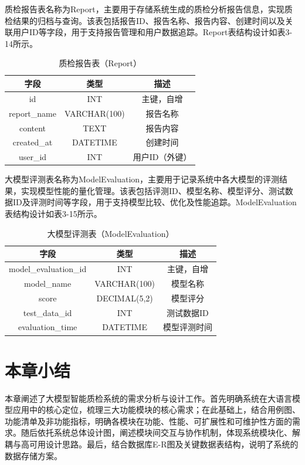 质检报告表名称为Report，主要用于存储系统生成的质检分析报告信息，实现质检结果的归档与查询。该表包括报告ID、报告名称、报告内容、创建时间以及关联用户ID等字段，用于支持报告管理和用户数据追踪。Report表结构设计如表3-14所示。
\begin{table}[h!]
\centering
\caption{质检报告表（Report）}
\begin{tabular}{|c|c|c|}
\hline
字段              & 类型         & 描述                    \\
\hline
id                & INT          & 主键，自增              \\
report\_name      & VARCHAR(100) & 报告名称                \\
content           & TEXT         & 报告内容                \\
created\_at       & DATETIME     & 创建时间                \\
user\_id          & INT          & 用户ID（外键）          \\
\hline
\end{tabular}
\end{table}

大模型评测表名称为ModelEvaluation，主要用于记录系统中各大模型的评测结果，实现模型性能的量化管理。该表包括评测ID、模型名称、模型评分、测试数据ID及评测时间等字段，用于支持模型比较、优化及性能追踪。ModelEvaluation表结构设计如表3-15所示。
\begin{table}[h!]
\centering
\caption{大模型评测表（ModelEvaluation）}
\begin{tabular}{|c|c|c|}
\hline
字段              & 类型         & 描述                    \\
\hline
model\_evaluation\_id                & INT          & 主键，自增              \\
model\_name       & VARCHAR(100) & 模型名称                \\
score             & DECIMAL(5,2) & 模型评分                \\
test\_data\_id    & INT          & 测试数据ID              \\
evaluation\_time  & DATETIME     & 模型评测时间            \\
\hline
\end{tabular}
\end{table}

\section{本章小结}
本章阐述了大模型智能质检系统的需求分析与设计工作。首先明确系统在大语言模型应用中的核心定位，梳理三大功能模块的核心需求；在此基础上，结合用例图、功能清单及非功能指标，明确各模块在功能、性能、可扩展性和可维护性方面的需求。随后依托系统总体设计图，阐述模块间交互与协作机制，体现系统模块化、解耦与高可用设计思路。最后，结合数据库E-R图及关键数据表结构，说明了系统的数据存储方案。


